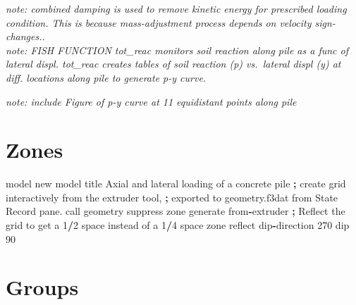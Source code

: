 \documentclass[a4paper, nobind]{templates/ociamthesis}
\newenvironment{Shaded}{\begin{snugshade}}{\end{snugshade}}
\newcommand{\DecValTok}[1]{\textcolor[rgb]{0.00,0.00,0.81}{#1}}
\newcommand{\ImportTok}[1]{#1}
\newcommand{\NormalTok}[1]{#1}
\newcommand{\OperatorTok}[1]{\textcolor[rgb]{0.81,0.36,0.00}{\textbf{#1}}}
\newcommand{\StringTok}[1]{\textcolor[rgb]{0.31,0.60,0.02}{#1}}
\renewenvironment{Shaded}
{
  \vspace{10pt}%
  \begin{snugshade}%
}{%
  \end{snugshade}%
  \vspace{8pt}%
}
\begin{document}
\begin{enumerate}
  \hfill\break
  \emph{note: combined damping is used to remove kinetic energy for
  prescribed loading condition. This is because mass-adjustment
  process depends on velocity sign-changes..}\\
  \emph{note: FISH FUNCTION tot\_reac monitors soil reaction along pile as a
  func of lateral displ. tot\_reac creates tables of soil reaction (p)
  vs.~lateral displ (y) at diff. locations along pile to generate p-y
  curve.}

  \hfill\break
  \emph{note: include Figure of p-y curve at 11 equidistant points along
  pile}\\
\end{enumerate}

\hypertarget{zones-1}{%
\section{Zones}\label{zones-1}}

\begin{Shaded}
\begin{Highlighting}[]
\NormalTok{model new}
\NormalTok{model title }\StringTok{\textquotesingle{}Axial and lateral loading of a concrete pile\textquotesingle{}}
\OperatorTok{;}\NormalTok{ create grid interactively }\ImportTok{from}\NormalTok{ the extruder tool, }
\OperatorTok{;}\NormalTok{ exported to geometry.f3dat }\ImportTok{from}\NormalTok{ State Record pane.}
\NormalTok{call }\StringTok{\textquotesingle{}geometry\textquotesingle{}}\NormalTok{ suppress}
\NormalTok{zone generate }\ImportTok{from}\OperatorTok{{-}}\NormalTok{extruder}
\OperatorTok{;}\NormalTok{ Reflect the grid to get a }\DecValTok{1}\OperatorTok{/}\DecValTok{2}\NormalTok{ space instead of a }\DecValTok{1}\OperatorTok{/}\DecValTok{4}\NormalTok{ space}
\NormalTok{zone reflect dip}\OperatorTok{{-}}\NormalTok{direction }\DecValTok{270}\NormalTok{ dip }\DecValTok{90}
\end{Highlighting}
\end{Shaded}

\hypertarget{groups}{%
\section{Groups}\label{groups}}
\end{document}

